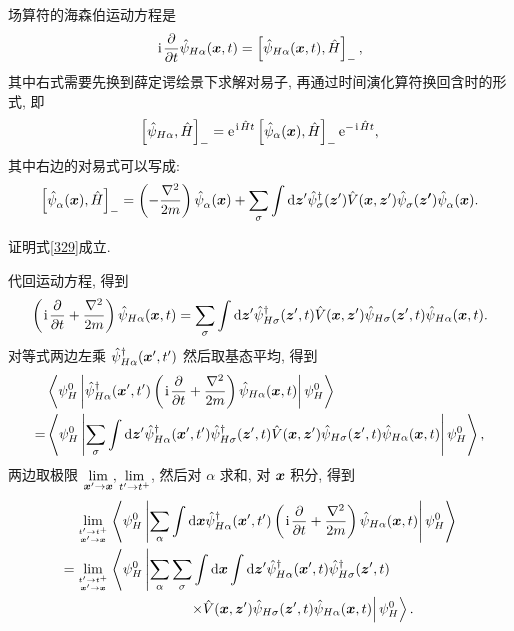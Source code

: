 场算符的海森伯运动方程是
\begin{equation}
    \hspace{0.1em}\mathrm{i}\hspace{0.1em}\frac{\partial}{\partial t}\hat{\psi}_{H\alpha}(\boldsymbol{x},t)=\left[ \hat\psi_{H\alpha}(\boldsymbol{x},t),\hat{H} \right]_-,
\end{equation}
其中右式需要先换到薛定谔绘景下求解对易子, 再通过时间演化算符换回含时的形式, 即
\begin{equation}
    \left[ \hat{\psi}_{H\alpha},\hat{H} \right]_-=\mathrm{e}^{\hspace{0.1em}\mathrm{i}\hspace{0.1em}\hat{H}t}\left[ \hat{\psi}_\alpha(\boldsymbol{x}),\hat{H} \right]_-\mathrm{e}^{-\hspace{0.1em}\mathrm{i}\hspace{0.1em}\hat{H}t},
\end{equation}
其中右边的对易式可以写成:
\begin{equation}\label{329}
    \left[ \hat\psi^{ }_\alpha(\boldsymbol{x}),\hat{H} \right]_-=\left( -\frac{\nabla^2}{2m} \right)\hat{\psi}^{ }_\alpha(\boldsymbol{x})+\sum_\sigma\int\mathrm{d}\boldsymbol{z}' \hat{\psi}_\sigma^\dagger(\boldsymbol{z}') \hat{V}(\boldsymbol{x},\boldsymbol{z}')\hat{\psi}^{ }_\sigma(\boldsymbol{z'})\hat{\psi}^{ }_\alpha(\boldsymbol{x}).
\end{equation}
\begin{question}{}{}
证明式\eqref{329}成立.
\end{question}
代回运动方程, 得到
\begin{equation}
    \left( \hspace{0.1em}\mathrm{i}\hspace{0.1em}\frac{\partial}{\partial t}+\frac{\nabla^2}{2m} \right)\hat\psi_{H\alpha}(\boldsymbol{x},t)=\sum_\sigma\int\mathrm{d}\boldsymbol{z}'\hat\psi_{H\sigma}^\dagger(\boldsymbol{z}',t)\hat{V}(\boldsymbol{x},\boldsymbol{z}')\hat\psi_{H\sigma}(\boldsymbol{z}',t)\hat\psi_{H\alpha}(\boldsymbol{x},t).
\end{equation}
对等式两边左乘 $\hat\psi_{H\alpha}^\dagger(\boldsymbol{x}',t')$ 然后取基态平均, 得到
  \begin{align}
        &\left\langle \psi_H^0\left| \hat\psi_{H\alpha}^\dagger(\boldsymbol{x}',t')\left( \hspace{0.1em}\mathrm{i}\hspace{0.1em}\frac{\partial}{\partial t}+\frac{\nabla^2}{2m}\right)\hat\psi_{H\alpha}(\boldsymbol{x},t) \right|\psi_H^0 \right\rangle\nonumber\\
        =&\left\langle \psi_H^0\left|\sum_\sigma\int\mathrm{d}\boldsymbol{z}'\hat\psi_{H\alpha}^\dagger(\boldsymbol{x}',t')\hat{\psi}_{H\sigma}^\dagger(\boldsymbol{z}',t)\hat{V}(\boldsymbol{x},\boldsymbol{z}') \hat\psi_{H\sigma}(\boldsymbol{z}',t)\hat\psi_{H\alpha}(\boldsymbol{x},t)\right|\psi_H^0\right\rangle,
    \end{align}
两边取极限 $\displaystyle \lim_{\boldsymbol{x}'\to \boldsymbol{x}},\lim_{t'\to t^+}$, 然后对 $\alpha$ 求和, 对 $\boldsymbol{x}$ 积分, 得到
 \begin{align}
        &\lim_{t'\to t^+\atop\boldsymbol{x}'\to \boldsymbol{x}}\left\langle \psi_H^0\left| \sum_{\alpha}\int\mathrm{d}\boldsymbol{x}\hat\psi_{H\alpha}^\dagger(\boldsymbol{x}',t')\left( \hspace{0.1em}\mathrm{i}\hspace{0.1em}\frac{\partial}{\partial t}+\frac{\nabla^2}{2m} \right)\hat\psi_{H\alpha}(\boldsymbol{x},t)\right|\psi_H^0 \right\rangle\nonumber\\
        =&\lim_{t'\to t^+\atop\boldsymbol{x}'\to \boldsymbol{x}}\left\langle \psi_H^0\left| \sum_\alpha\sum_\sigma\int\mathrm{d}\boldsymbol{x}\int\mathrm{d}\boldsymbol{z}'\hat\psi_{H\alpha}^\dagger(\boldsymbol{x}',t)\hat\psi_{H\sigma}^\dagger(\boldsymbol{z}',t)\right.\right.\nonumber\\
        &\left.\left.\qquad\qquad\qquad\qquad\times\hat{V}(\boldsymbol{x},\boldsymbol{z}')\hat\psi_{H\sigma}(\boldsymbol{z}',t)\hat{\psi}_{H\alpha}(\boldsymbol{x},t) \right|\psi_H^0 \right\rangle.
    \end{align}
